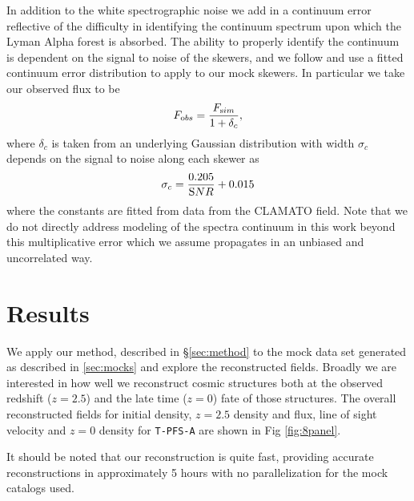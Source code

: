 \documentclass[times]{aastex62}
\begin{document}
In addition to the white spectrographic noise we add in a continuum error reflective of the difficulty in identifying the continuum spectrum upon which the Lyman Alpha forest is absorbed. The ability to properly identify the continuum is dependent on the signal to noise of the skewers, and we follow \cite{2018Krolewski} and use a fitted continuum error distribution to apply to our mock skewers. In particular we take our observed flux to be 
\begin{equation}
    F_{\textrm obs} = \frac{F_{\text sim}}{1+\delta_c},
\end{equation}
where $\delta_c$ is taken from an underlying Gaussian distribution
with width $\sigma_c$ depends on the signal to noise along each skewer as
\begin{equation}
 \sigma_c = \frac{0.205}{{\textrm SNR}} + 0.015
\end{equation}
where the constants are fitted from data from the CLAMATO field.  Note that we do not directly address modeling of the spectra continuum in this work beyond this multiplicative error which we assume propagates in an unbiased and uncorrelated way. %



\section{Results}
\label{sec:results}

We apply our method, described in \S\ref{sec:method} to the mock data set generated as described in \ref{sec:mocks} and explore the reconstructed fields. Broadly we are interested in how well we reconstruct cosmic structures both at the observed redshift ($z=2.5$) and the late time ($z=0$) fate of those structures. The overall reconstructed fields for initial density, $z=2.5$ density and flux, line of sight velocity and $z=0$ density for \texttt{T-PFS-A} are shown in Fig \ref{fig:8panel}. 

It should be noted that our reconstruction is quite fast, providing accurate reconstructions in approximately 5 hours with no parallelization for the mock catalogs used. 

\end{document}
